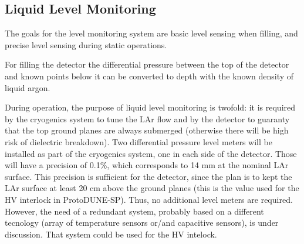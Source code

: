 \subsection{Liquid Level Monitoring}
\label{sec:fdgen-slow-cryo-liq-lev}

The goals for the level monitoring system are basic level sensing when filling, and precise level sensing during static operations. 

For filling the detector the differential pressure between the top of the
detector and known points below it can be converted to depth with the known
density of liquid argon.

During operation, the purpose of liquid level monitoring is twofold: it is required by the cryogenics system to tune the LAr flow and by the detector
to guaranty that the top ground planes are always submerged (otherwise there will be high risk of dielectric breakdown).  
Two differential pressure level meters will be installed as part of the cryogenics system, one in each side of the detector.
Those will have a precision of 0.1\%, which corresponds to 14 mm at the nominal LAr surface.
This precision is sufficient for the detector, since the plan is to kept the LAr surface at
least 20 cm above the ground planes (this is the value used for the HV interlock in
ProtoDUNE-SP). Thus, no additional level meters are required. However, the need of a redundant system, probably based on a different tecnology
(array of temperature sensors or/and capacitive sensors), is under discussion. That system could be used for the HV intelock. 


 
